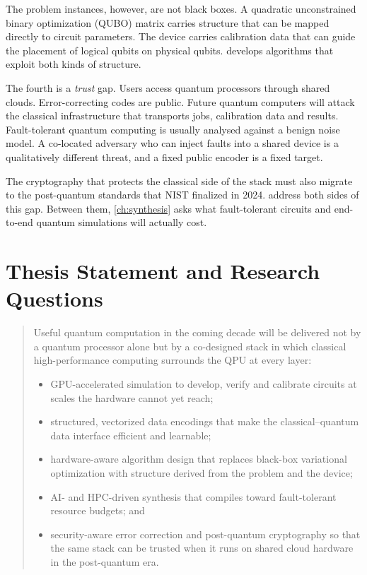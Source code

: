The problem instances, however, are not black boxes. A quadratic unconstrained binary optimization (QUBO) matrix carries structure that can be mapped directly to circuit parameters. The device carries calibration data that can guide the placement of logical qubits on physical qubits.  develops algorithms that exploit both kinds of structure.

The fourth is a \emph{trust} gap. Users access quantum processors through shared clouds. Error-correcting codes are public. Future quantum computers will attack the classical infrastructure that transports jobs, calibration data and results. Fault-tolerant quantum computing is usually analysed against a benign noise model. A co-located adversary who can inject faults into a shared device is a qualitatively different threat, and a fixed public encoder is a fixed target.

The cryptography that protects the classical side of the stack must also migrate to the post-quantum standards that NIST finalized in 2024.  address both sides of this gap. Between them, \cref{ch:synthesis} asks what fault-tolerant circuits and end-to-end quantum simulations will actually cost.

\section{Thesis Statement and Research Questions}\label{sec:intro:thesis}

\begin{quote}
Useful quantum computation in the coming decade will be delivered not by a quantum processor alone but by a co-designed stack in which classical high-performance computing surrounds the QPU at every layer:
\begin{itemize}[nosep,leftmargin=1.5em]
\item GPU-accelerated simulation to develop, verify and calibrate circuits at scales the hardware cannot yet reach;
\item structured, vectorized data encodings that make the classical--quantum data interface efficient and learnable;
\item hardware-aware algorithm design that replaces black-box variational optimization with structure derived from the problem and the device;
\item AI- and HPC-driven synthesis that compiles toward fault-tolerant resource budgets; and
\item security-aware error correction and post-quantum cryptography so that the same stack can be trusted when it runs on shared cloud hardware in the post-quantum era.
\end{itemize}
\end{quote}

